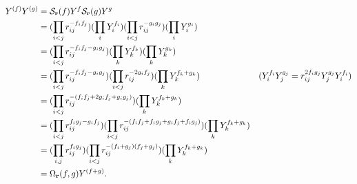 \begin{align*}
	Y^{(f)}Y^{(g)}
	 & = \mathcal{S}_{\mathbf{r}}(f)Y^f\mathcal{S}_{\mathbf{r}}(g)Y^g                                    \\
	 & = (\prod_{i < j}r_{ij}^{-f_if_j})(\prod_{i}Y_i^{f_i})
	(\prod_{i < j}r_{ij}^{-g_ig_j})( \prod_{i}Y_i^{g_i})                                   \\
	 & = (\prod_{i < j}r_{ij}^{-f_if_j - g_ig_j})
	(\prod_{k}Y_k^{f_k})(\prod_{k}Y_k^{g_k})                                               \\
	 & = (\prod_{i < j}r_{ij}^{-f_if_j - g_ig_j})
	(\prod_{i < j}r_{ij}^{-2g_if_j})(\prod_{k}Y_k^{f_k + g_k})
	 & (Y_i^{f_i} Y_j^{g_j} = r_{ij}^{2f_ig_j}Y_j^{g_j}Y_i^{f_i})                          \\
	 & = (\prod_{i < j}r_{ij}^{-(f_if_j +2g_if_j + g_ig_j)})
	(\prod_{k}Y_k^{f_k + g_k})                                                             \\
	 & = (\prod_{i < j}r_{ij}^{f_ig_j - g_if_j})
	(\prod_{i < j}r_{ij}^{-(f_if_j + f_ig_j + g_if_j + f_ig_j)})(\prod_{k}Y_k^{f_k + g_k}) \\
	 & = (\prod_{i,j}r_{ij}^{f_ig_j})
	(\prod_{i < j}r_{ij}^{-(f_i + g_j)(f_j + g_j)})(\prod_{k}Y_k^{f_k + g_k})              \\
	 & = \Omega_{\mathbf{r}}(f,g)Y^{(f + g)}.
\end{align*}

\medskip

